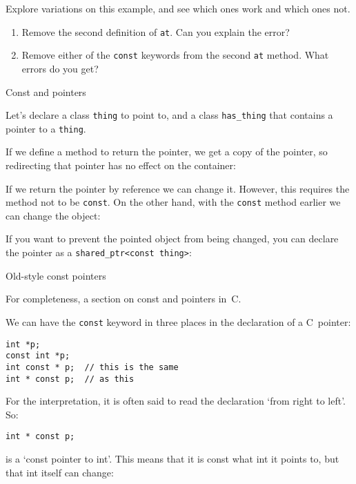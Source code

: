 \begin{exercise}
  \label{ex:const-poly}
  Explore variations on this example, and see which ones work and
  which ones not.
  \begin{enumerate}
  \item Remove the second definition of \lstinline{at}. Can you
    explain the error?
  \item
    Remove either of the \lstinline{const} keywords from the second
    \lstinline{at} method. What errors do you get?
  \end{enumerate}
\end{exercise}


 {Const and pointers}

Let's declare a class \lstinline{thing} to point to, and a class \lstinline{has_thing}
that contains a pointer to a \lstinline{thing}.

\begin{multicols}{2}
\end{multicols}

If we define a method to return the pointer, we get a copy of the
pointer, so redirecting that pointer has no effect on the container:
%

If we return the pointer by reference we can
change it. However, this requires the method not to be \lstinline{const}.
On the other hand, with the \lstinline{const} method earlier we can change the
object:
%

If you want to prevent the pointed object from being changed, you can
declare the pointer as a \lstinline+shared_ptr<const thing>+:
%
\begin{multicols}{2}
\end{multicols}

 {Old-style const pointers}

For completeness, a section on const and pointers in~C.

We can have the \lstinline{const} keyword in three places
in the declaration of a C~pointer:
\begin{lstlisting}
int *p;
const int *p;
int const * p;  // this is the same
int * const p;  // as this
\end{lstlisting}

For the interpretation, it is often said to read the declaration
`from right to left'.
So:
\begin{lstlisting}
int * const p;
\end{lstlisting}
is a `const pointer to int'.
This means that it is const what int it points to,
but that int itself can change:


